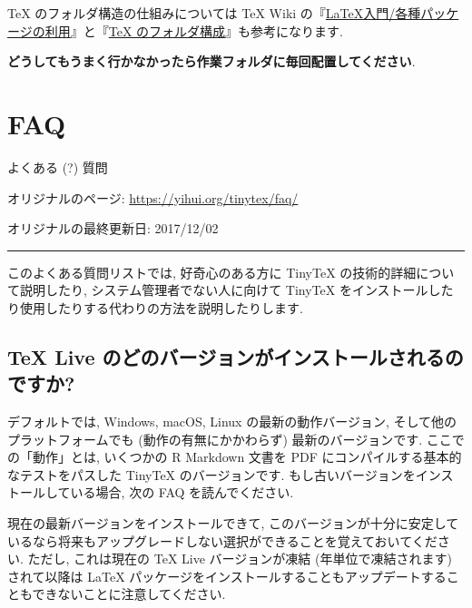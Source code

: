 \documentclass[
  xelatex,ja=standard,jafont=noto]{bxjsreport}
\begin{document}
TeX のフォルダ構造の仕組みについては TeX Wiki
の『\href{https://texwiki.texjp.org/?LaTeX\%E5\%85\%A5\%E9\%96\%80\%2F\%E5\%90\%84\%E7\%A8\%AE\%E3\%83\%91\%E3\%83\%83\%E3\%82\%B1\%E3\%83\%BC\%E3\%82\%B8\%E3\%81\%AE\%E5\%88\%A9\%E7\%94\%A8}{LaTeX入門/各種パッケージの利用}』と『\href{https://texwiki.texjp.org/?TeX\%20\%E3\%81\%AE\%E3\%83\%87\%E3\%82\%A3\%E3\%83\%AC\%E3\%82\%AF\%E3\%83\%88\%E3\%83\%AA\%E6\%A7\%8B\%E6\%88\%90}{TeX
のフォルダ構成}』も参考になります.

\textbf{どうしてもうまく行かなかったら作業フォルダに毎回配置してください}.

\hypertarget{faq}{%
\chapter{FAQ}\label{faq}}

よくある (?) 質問

オリジナルのページ: \url{https://yihui.org/tinytex/faq/}

オリジナルの最終更新日: 2017/12/02

\begin{center}\rule{0.5\linewidth}{0.5pt}\end{center}

このよくある質問リストでは, 好奇心のある方に TinyTeX
の技術的詳細について説明したり, システム管理者でない人に向けて TinyTeX
をインストールしたり使用したりする代わりの方法を説明したりします.

\hypertarget{tex-live-ux306eux3069ux306eux30d0ux30fcux30b8ux30e7ux30f3ux304cux30a4ux30f3ux30b9ux30c8ux30fcux30ebux3055ux308cux308bux306eux3067ux3059ux304b}{%
\section{TeX Live
のどのバージョンがインストールされるのですか?}\label{tex-live-ux306eux3069ux306eux30d0ux30fcux30b8ux30e7ux30f3ux304cux30a4ux30f3ux30b9ux30c8ux30fcux30ebux3055ux308cux308bux306eux3067ux3059ux304b}}

デフォルトでは, Windows, macOS, Linux の最新の動作バージョン,
そして他のプラットフォームでも (動作の有無にかかわらず)
最新のバージョンです. ここでの「動作」とは, いくつかの R Markdown 文書を
PDF にコンパイルする基本的なテストをパスした TinyTeX のバージョンです.
もし古いバージョンをインストールしている場合, 次の FAQ を読んでください.

現在の最新バージョンをインストールできて,
このバージョンが十分に安定しているなら将来もアップグレードしない選択ができることを覚えておいてください.
ただし, これは現在の TeX Live バージョンが凍結 (年単位で凍結されます)
されて以降は LaTeX
パッケージをインストールすることもアップデートすることもできないことに注意してください.
\end{document}
